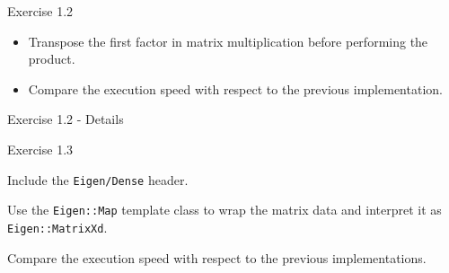 \documentclass[10pt]{beamer}
\begin{document}
\begin{frame}{Exercise 1.2}
\begin{itemize}
\item Transpose the first factor in matrix multiplication before performing the product.
\item Compare the execution speed with respect to the previous implementation.
\end{itemize}
\end{frame}

\begin{frame}{Exercise 1.2 - Details}
\begin{figure}
    \centering
    \caption{}
\end{figure}
\end{frame}

\begin{frame}{Exercise 1.3}
\begin{itemize}
{\color{gray}\item Include the {\tt Eigen/Dense} header.
\item Use the {\tt Eigen::Map} template class to wrap the matrix data and interpret it as {\tt Eigen::MatrixXd}.}
{\item Compare the execution speed with respect to the previous implementations.}
\end{itemize}
\end{frame}
\end{document}
